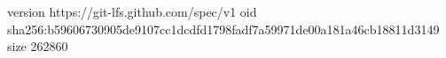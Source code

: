 version https://git-lfs.github.com/spec/v1
oid sha256:b59606730905de9107cc1dcdfd1798fadf7a59971de00a181a46cb18811d3149
size 262860
